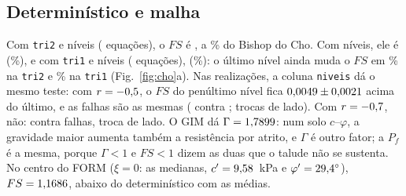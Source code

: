 \documentclass[11pt,a4paper]{article}
\begin{document}
\subsection{Determinístico e malha}\label{sec:chomalha}
Com \texttt{tri2} e \ChoNivTriDois{} níveis (\ChoEqTriDois{} equações), o $FS$ é \ChoDetTriDois, a \ChoDifTriDois\% do
Bishop do Cho. Com \ChoNivTriDoisTres{} níveis, ele é \ChoDetTriDoisTres{} (\ChoDifTriDoisTres\%), e com \texttt{tri1}
e \ChoNivTriUm{} níveis (\ChoEqTriUm{} equações), \ChoDetTriUm{} (\ChoDifTriUm\%): o último nível ainda muda o $FS$ em
\ChoUltNivTriDois\% na \texttt{tri2} e \ChoUltNivTriUm\% na \texttt{tri1} (Fig.~\ref{fig:cho}a). Nas realizações, a coluna
\texttt{niveis} dá o mesmo teste: com $r = -0{,}5$, o $FS$ do penúltimo nível fica $0{,}0049 \pm
0{,}0021$ acima do último, e as falhas são as mesmas (\ChoCincoNivNf{} contra \ChoCincoNf; \ChoCincoNivTrocas{}
trocas de lado). Com $r = -0{,}7$, não: \ChoSeteNivNf{} contra \ChoSeteNf{} falhas, \ChoSeteNivTrocas{} troca de
lado. O GIM dá $\Gamma = 1{,}7899$: num solo $c$--$\varphi$, a
gravidade maior aumenta também a resistência por atrito, e $\Gamma$ é outro fator; a $P_f$ é a mesma, porque $\Gamma < 1$
e $FS < 1$ dizem as duas que o talude não se sustenta. No centro do FORM ($\xi = 0$: as medianas, $c' = 9{,}58$~kPa
e $\varphi' = 29{,}4^\circ$), $FS = 1{,}1686$, abaixo do determinístico com as médias.
\end{document}
